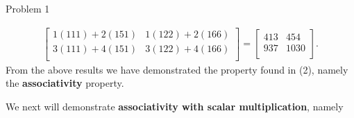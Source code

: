 \begin{problem}{Problem 1}
\begin{Highlight}[Solution]
\begin{align*}
\begin{bmatrix}
                1(111) + 2(151) & 1(122) + 2(166) \\
                3(111) + 4(151) & 3(122) + 4(166) \\
            \end{bmatrix}
            = 
            \begin{bmatrix}
                413 & 454 \\
                937 & 1030 \\
            \end{bmatrix}.
        \end{align*}
        From the above results we have demonstrated the property found in (2), namely the \textbf{associativity} property.

        We next will demonstrate \textbf{associativity with scalar multiplication}, namely


\end{Highlight}
\end{problem}
